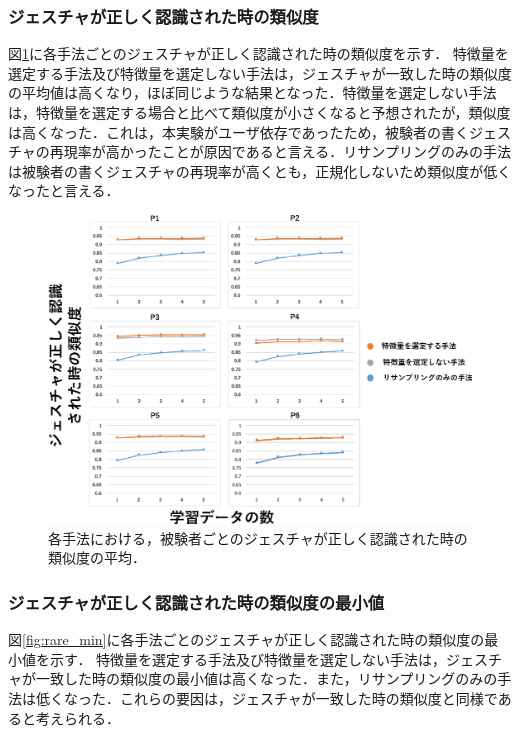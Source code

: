 \subsubsection{ジェスチャが正しく認識された時の類似度}
図\ref{fig:rare_sim}に各手法ごとのジェスチャが正しく認識された時の類似度を示す．
特徴量を選定する手法及び特徴量を選定しない手法は，ジェスチャが一致した時の類似度の平均値は高くなり，ほぼ同じような結果となった．特徴量を選定しない手法は，特徴量を選定する場合と比べて類似度が小さくなると予想されたが，類似度は高くなった．これは，本実験がユーザ依存であったため，被験者の書くジェスチャの再現率が高かったことが原因であると言える．リサンプリングのみの手法は被験者の書くジェスチャの再現率が高くとも，正規化しないため類似度が低くなったと言える．

\begin{figure}[!h]
\centering
\includegraphics[width=0.9\columnwidth]{img/pre_sim.eps}
\caption{各手法における，被験者ごとのジェスチャが正しく認識された時の類似度の平均．}
\label{fig:rare_sim}
\end{figure}

\newpage
\subsubsection{ジェスチャが正しく認識された時の類似度の最小値}
図\ref{fig:rare_min}に各手法ごとのジェスチャが正しく認識された時の類似度の最小値を示す．
特徴量を選定する手法及び特徴量を選定しない手法は，ジェスチャが一致した時の類似度の最小値は高くなった．また，リサンプリングのみの手法は低くなった．これらの要因は，ジェスチャが一致した時の類似度と同様であると考えられる．

